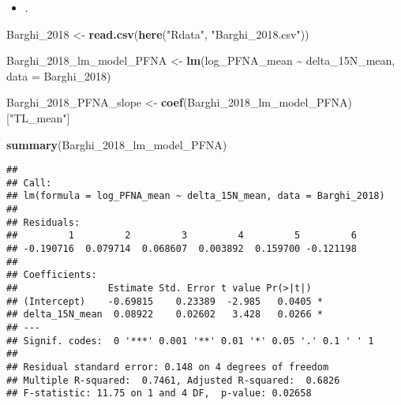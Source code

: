 \documentclass[
]{article}
\newenvironment{Shaded}{\begin{snugshade}}{\end{snugshade}}
\newcommand{\AttributeTok}[1]{\textcolor[rgb]{0.13,0.29,0.53}{#1}}
\newcommand{\FunctionTok}[1]{\textcolor[rgb]{0.13,0.29,0.53}{\textbf{#1}}}
\newcommand{\NormalTok}[1]{#1}
\newcommand{\OtherTok}[1]{\textcolor[rgb]{0.56,0.35,0.01}{#1}}
\newcommand{\SpecialCharTok}[1]{\textcolor[rgb]{0.81,0.36,0.00}{\textbf{#1}}}
\newcommand{\StringTok}[1]{\textcolor[rgb]{0.31,0.60,0.02}{#1}}
\providecommand{\tightlist}{%
  \setlength{\itemsep}{0pt}\setlength{\parskip}{0pt}}
\begin{document}
\begin{itemize}
\tightlist
\item
  .
\end{itemize}

\begin{Shaded}
\begin{Highlighting}[]
\NormalTok{Barghi\_2018 }\OtherTok{\textless{}{-}} \FunctionTok{read.csv}\NormalTok{(}\FunctionTok{here}\NormalTok{(}\StringTok{"Rdata"}\NormalTok{, }\StringTok{"Barghi\_2018.csv"}\NormalTok{))}

\NormalTok{Barghi\_2018\_lm\_model\_PFNA }\OtherTok{\textless{}{-}} \FunctionTok{lm}\NormalTok{(log\_PFNA\_mean }\SpecialCharTok{\textasciitilde{}}\NormalTok{ delta\_15N\_mean,}
                                       \AttributeTok{data =}\NormalTok{ Barghi\_2018)}

\NormalTok{Barghi\_2018\_PFNA\_slope }\OtherTok{\textless{}{-}} \FunctionTok{coef}\NormalTok{(Barghi\_2018\_lm\_model\_PFNA)[}\StringTok{"TL\_mean"}\NormalTok{]}

\FunctionTok{summary}\NormalTok{(Barghi\_2018\_lm\_model\_PFNA)}
\end{Highlighting}
\end{Shaded}

\begin{verbatim}
## 
## Call:
## lm(formula = log_PFNA_mean ~ delta_15N_mean, data = Barghi_2018)
## 
## Residuals:
##         1         2         3         4         5         6 
## -0.190716  0.079714  0.068607  0.003892  0.159700 -0.121198 
## 
## Coefficients:
##                Estimate Std. Error t value Pr(>|t|)  
## (Intercept)    -0.69815    0.23389  -2.985   0.0405 *
## delta_15N_mean  0.08922    0.02602   3.428   0.0266 *
## ---
## Signif. codes:  0 '***' 0.001 '**' 0.01 '*' 0.05 '.' 0.1 ' ' 1
## 
## Residual standard error: 0.148 on 4 degrees of freedom
## Multiple R-squared:  0.7461, Adjusted R-squared:  0.6826 
## F-statistic: 11.75 on 1 and 4 DF,  p-value: 0.02658
\end{verbatim}
\end{document}

